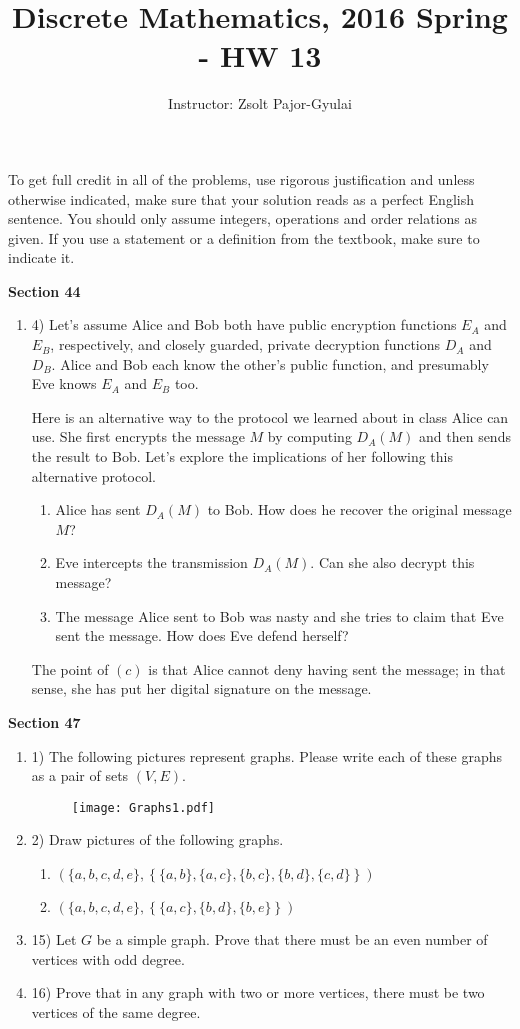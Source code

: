 \documentclass[11pt]{preprint}
\title{Discrete Mathematics, 2016 Spring - HW 13}
\author{Instructor: Zsolt Pajor-Gyulai}
\institute{Courant Institute of Mathematical Sciences, NYU}
\def\enumb{\begin{enumerate}}
\def\enume{\end{enumerate}}
\begin{document}
\maketitle

To get full credit  in all of the problems, use rigorous justification and unless otherwise indicated, make sure that your solution reads as a perfect English sentence. You should only assume integers, operations and order relations as given. If you use a statement or a definition from the textbook, make sure to indicate it.
\vspace{0.2cm}

\textbf{Section 44}
\enumb
\item[4)] Let's assume Alice and Bob both have public encryption functions $E_A$ and $E_B$, respectively, and closely guarded, private decryption functions $D_A$ and $D_B$. Alice and Bob each know the other's public function, and presumably Eve knows $E_A$ and $E_B$ too.


Here is an alternative way  to the protocol we learned about in class Alice can use. She first encrypts the message $M$ by computing $D_A(M)$ and then sends the result to Bob. Let's explore the implications of her following this alternative protocol.
\enumb
\item Alice has sent $D_A(M)$ to Bob. How does he recover the original message $M$?
\item Eve intercepts the transmission $D_A(M)$. Can she also decrypt this message?
\item The message Alice sent to Bob was nasty and she tries to claim that Eve sent the message. How does Eve defend herself?
\enume
The point of $(c)$ is that Alice cannot deny having sent the message; in that sense, she has put her digital signature on the message.
\enume

\textbf{Section 47}
\enumb
\item[1)] The following pictures represent graphs. Please write each of these graphs as a pair of sets $(V,E)$.
\begin{figure}[ht]
\centering
\texttt{[image: Graphs1.pdf]}
\end{figure}


\item[2)] Draw pictures of the following graphs.
\enumb
\item $\left(\{a,b,c,d,e\},\left\{\{a,b\},\{a,c\},\{b,c\},\{b,d\},\{c,d\}\right\}\right)$
\item $\left(\{a,b,c,d,e\},\left\{\{a,c\},\{b,d\},\{b,e\}\right\}\right)$
\enume
\item[15)] Let $G$ be a simple graph. Prove that there must be an even number of vertices with odd degree.
\item[16)] Prove that in any graph with two or more vertices, there must be two vertices of the same degree.
\enume
\end{document}
